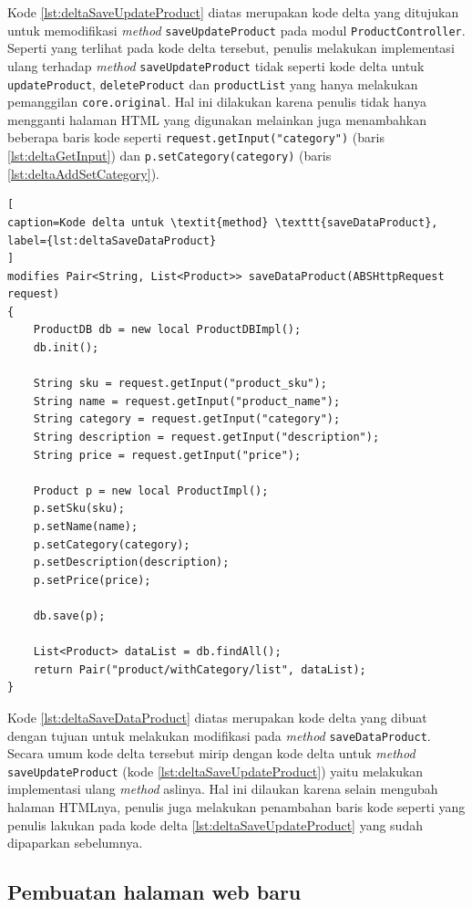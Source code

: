 Kode \ref{lst:deltaSaveUpdateProduct} diatas merupakan kode delta yang ditujukan untuk memodifikasi \textit{method} \texttt{saveUpdateProduct} pada modul \texttt{ProductController}. Seperti yang terlihat pada kode delta tersebut, penulis melakukan implementasi ulang terhadap \textit{method} \texttt{saveUpdateProduct} tidak seperti kode delta untuk \texttt{updateProduct}, \texttt{deleteProduct} dan \texttt{productList} yang hanya melakukan pemanggilan \texttt{core.original}. Hal ini dilakukan karena penulis tidak hanya mengganti halaman HTML yang digunakan melainkan juga menambahkan beberapa baris kode seperti \texttt{request.getInput("category")} (baris \ref{lst:deltaGetInput}) dan \texttt{p.setCategory(category)} (baris \ref{lst:deltaAddSetCategory}).

\begin{lstlisting}[
caption=Kode delta untuk \textit{method} \texttt{saveDataProduct},
label={lst:deltaSaveDataProduct}
]
modifies Pair<String, List<Product>> saveDataProduct(ABSHttpRequest request)
{
	ProductDB db = new local ProductDBImpl();
	db.init();
	
	String sku = request.getInput("product_sku");
	String name = request.getInput("product_name");
	String category = request.getInput("category");
	String description = request.getInput("description");
	String price = request.getInput("price");
	
	Product p = new local ProductImpl();
	p.setSku(sku);
	p.setName(name);
	p.setCategory(category);
	p.setDescription(description);
	p.setPrice(price);
	
	db.save(p);
	
	List<Product> dataList = db.findAll();
	return Pair("product/withCategory/list", dataList);
}
\end{lstlisting}

Kode \ref{lst:deltaSaveDataProduct} diatas merupakan kode delta yang dibuat dengan tujuan untuk melakukan modifikasi pada \textit{method} \texttt{saveDataProduct}. Secara umum kode delta tersebut mirip dengan kode delta untuk \textit{method} \texttt{saveUpdateProduct} (kode \ref{lst:deltaSaveUpdateProduct}) yaitu melakukan implementasi ulang \textit{method} aslinya. Hal ini dilaukan karena selain mengubah halaman HTMLnya, penulis juga melakukan penambahan baris kode seperti yang penulis lakukan pada kode delta \ref{lst:deltaSaveUpdateProduct} yang sudah dipaparkan sebelumnya.

\subsection{Pembuatan halaman web baru}

